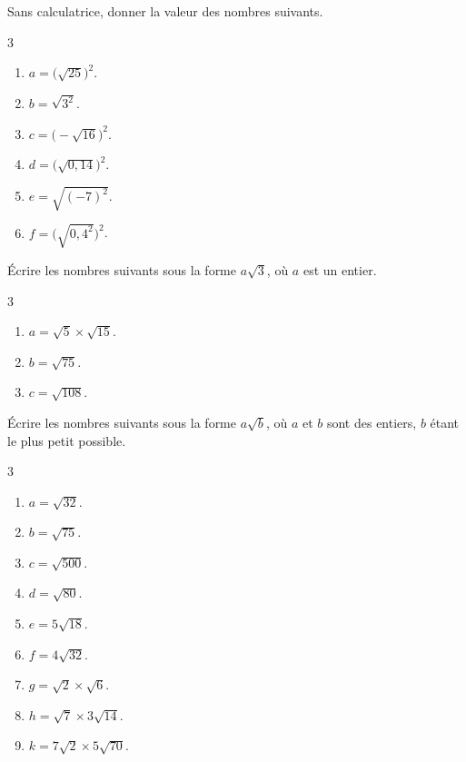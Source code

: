 
\exo

Sans calculatrice, donner la valeur des nombres suivants.

\vspace{-6pt}
\setlength{\columnsep}{1cm}
\setlength{\columnseprule}{0pt}
\begin{multicols}{3}
\begin{enumerate}
\item $a=\big(\sqrt{25}\big)^2$.
\medskip
\item $b=\sqrt{3^2}$.

\item $c=\big(-\sqrt{16}\big)^2$.
\medskip
\item $d=\big(\sqrt{0,14}\big)^2$.

\item $e=\sqrt{(-7)^2}$.
\medskip
\item $f=\big(\sqrt{0,4^2}\big)^2$.
\end{enumerate}
\end{multicols}
\vspace{-6pt}

\exo

Écrire les nombres suivants sous la forme $a\sqrt{3}$, où $a$ est un entier.

\vspace{-6pt}
\setlength{\columnsep}{1cm}
\setlength{\columnseprule}{0pt}
\begin{multicols}{3}
\begin{enumerate}
\item $a=\sqrt{5}\times\sqrt{15}$.
\item $b=\sqrt{75}$.
\item $c=\sqrt{108}$.
\end{enumerate}
\end{multicols}
\vspace{-6pt}

\exo

Écrire les nombres suivants sous la forme $a\sqrt{b}$, où $a$ et $b$ sont des entiers, $b$ étant le plus petit possible.

\vspace{-6pt}
\setlength{\columnsep}{1cm}
\setlength{\columnseprule}{0pt}
\begin{multicols}{3}
\begin{enumerate}
\item $a=\sqrt{32}$.
\medskip
\item $b=\sqrt{75}$.
\medskip
\item $c=\sqrt{500}$.

\item $d=\sqrt{80}$.
\medskip
\item $e=5\sqrt{18}$.
\medskip
\item $f=4\sqrt{32}$.

\item $g=\sqrt{2}\times \sqrt{6}$.
\medskip
\item $h=\sqrt{7}\times 3\sqrt{14}$.
\medskip
\item $k=7\sqrt{2}\times 5\sqrt{70}$.
\end{enumerate}
\end{multicols}
\vspace{-6pt}

